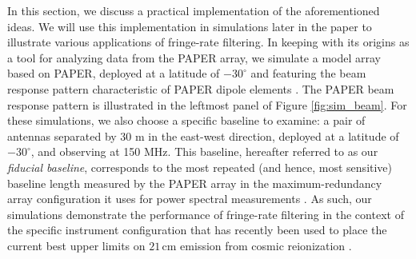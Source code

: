 \documentclass[twocolumn,apj,numberedappendix]{emulateapj}
\begin{document}
In this section, we discuss a practical implementation of the aforementioned ideas. We will use this implementation in simulations later in the paper to illustrate various applications of fringe-rate filtering. In 
keeping with its origins as a tool for analyzing data from the PAPER array, we simulate a model array based on PAPER, deployed at a latitude of $-30^\circ$
and featuring the beam response pattern characteristic of PAPER dipole elements \citep{parsons_et_al2008,pober_et_al2012}.
The PAPER beam response pattern is illustrated in the leftmost panel of Figure \ref{fig:sim_beam}.
For these simulations, we also choose a specific baseline to examine: a pair of antennas separated by 30 m in the 
east-west direction, deployed at a latitude of $-30^\circ$, and observing at 150 MHz.  This baseline, hereafter referred to as our {\it fiducial baseline}, 
corresponds to the most repeated (and hence,
most sensitive) baseline length measured by the PAPER array in the maximum-redundancy array configuration it uses
for power spectral measurements \citep{parsons_et_al2012a,P14,ali_et_al2015}.  As such, our simulations demonstrate the performance of fringe-rate filtering in the context of the specific instrument configuration
that has recently been used to place the current best upper limits on $21\,\textrm{cm}$ emission from cosmic reionization \citep{P14,J14,ali_et_al2015}.
\end{document}
